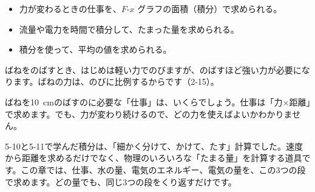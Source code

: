
\begin{goal}
\begin{itemize}[label={\color{bkTheme}●}, leftmargin=1.6\zw, itemsep=0pt, topsep=1pt]
\item {}\enspace 力が変わるときの仕事を、$F$-$x$ グラフの面積（積分）で求められる。
\item {}\enspace 流量や電力を時間で積分して、たまった量を求められる。
\item {}\enspace 積分を使って、平均の値を求められる。
\end{itemize}
\end{goal}

\begin{hatena}
\noindent\begin{minipage}[c]{0.58\linewidth}\raggedright
ばねをのばすとき、はじめは軽い力でのびますが、のばすほど強い力が必要になります。ばねの力は、のびに比例するからです（2-15）。

ばねを\qty{10}{cm}のばすのに必要な「仕事」は、いくらでしょう。仕事は「力×距離」で求めます。でも、力が変わり続けるので、どの力を使えばよいかわかりません。
\end{minipage}\hfill
\begin{minipage}[c]{0.38\linewidth}
\end{minipage}
\end{hatena}

5-10と5-11で学んだ積分は、「細かく分けて、かけて、たす」計算でした。速度から距離を求めるだけでなく、物理のいろいろな「たまる量」を計算する道具です。この章では、仕事、水の量、電気のエネルギー、電気の量を、この3つの段で求めます。どの量でも、同じ3つの段をくり返すだけです。

